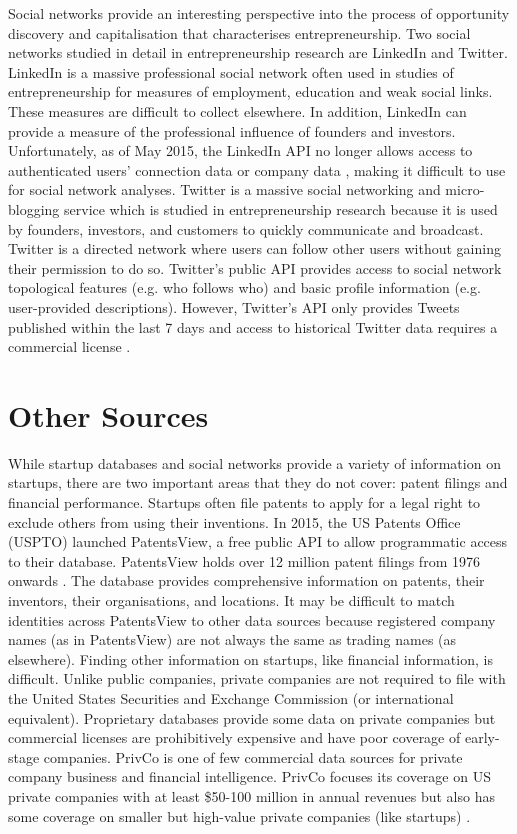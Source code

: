 Social networks provide an interesting perspective into the process of opportunity discovery and capitalisation that characterises entrepreneurship. Two social networks studied in detail in entrepreneurship research are LinkedIn and Twitter. LinkedIn is a massive professional social network often used in studies of entrepreneurship for measures of employment, education and weak social links. These measures are difficult to collect elsewhere. In addition, LinkedIn can provide a measure of the professional influence of founders and investors. Unfortunately, as of May 2015, the LinkedIn API no longer allows access to authenticated users' connection data or company data \cite{trachtenberg2015}, making it difficult to use for social network analyses. Twitter is a massive social networking and micro-blogging service which is studied in entrepreneurship research because it is used by founders, investors, and customers to quickly communicate and broadcast. Twitter is a directed network where users can follow other users without gaining their permission to do so. Twitter's public API provides access to social network topological features (e.g. who follows who) and basic profile information (e.g. user-provided descriptions). However, Twitter's API only provides Tweets published within the last 7 days and access to historical Twitter data requires a commercial license \cite{puschmann2013}.

\section{Other Sources}

While startup databases and social networks provide a variety of information on startups, there are two important areas that they do not cover: patent filings and financial performance. Startups often file patents to apply for a legal right to exclude others from using their inventions. In 2015, the US Patents Office (USPTO) launched PatentsView, a free public API to allow programmatic access to their database. PatentsView holds over 12 million patent filings from 1976 onwards \cite{schultz2016}. The database provides comprehensive information on patents, their inventors, their organisations, and locations. It may be difficult to match identities across PatentsView to other data sources because registered company names (as in PatentsView) are not always the same as trading names (as elsewhere). Finding other information on startups, like financial information, is difficult. Unlike public companies, private companies are not required to file with the United States Securities and Exchange Commission (or international equivalent). Proprietary databases provide some data on private companies but commercial licenses are prohibitively expensive and have poor coverage of early-stage companies. PrivCo is one of few commercial data sources for private company business and financial intelligence. PrivCo focuses its coverage on US private companies with at least \$50-100 million in annual revenues but also has some coverage on smaller but high-value private companies (like startups) \cite{artemchik2015}.
